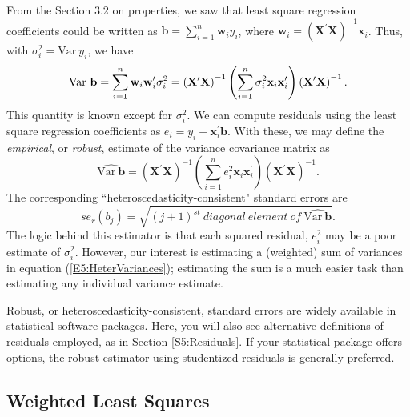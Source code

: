 From the Section 3.2 on properties, we saw that least square
regression coefficients could be written as $ \mathbf{b} =
\sum_{i=1}^n \mathbf{w}_i y_i $, where $\mathbf{w}_i =\left(
\mathbf{X}^{\prime}\mathbf{X}\right)^{-1} \mathbf{x}_i$. Thus, with
$\sigma_i^2 = \mathrm{Var~} y_i$, we have
\begin{equation}\label{E5:HeterVariances}
\mathrm{Var~}\mathbf{b} = \sum_{i=1}^n \mathbf{w}_i
\mathbf{w}_i^{\prime} \sigma_i^2  \\
=\left( \mathbf{X}^{\prime}\mathbf{X}\right)^{-1} \left(
\sum_{i=1}^n \sigma_i^2 \mathbf{x}_i \mathbf{x}_i^{\prime} \right)
\left( \mathbf{X}^{\prime}\mathbf{X}\right)^{-1}.
\end{equation}
This quantity is known except for $\sigma_i^2$. We can compute
residuals using the least square regression coefficients as $e_i =
y_i - \mathbf{x}_i^{\prime} \mathbf{b}$. With these, we may define
the \emph{empirical}, or \emph{robust}, estimate of the variance
covariance matrix as
\begin{equation*}
\widehat{\mathrm{Var~}\mathbf{b}} =\left(
\mathbf{X}^{\prime}\mathbf{X}\right)^{-1} \left( \sum_{i=1}^n e_i^2
\mathbf{x}_i \mathbf{x}_i^{\prime} \right) \left(
\mathbf{X}^{\prime}\mathbf{X}\right)^{-1}.
\end{equation*}
The corresponding ``heteroscedasticity-consistent" standard errors
are
\begin{equation}\label{E5:RobustSEs}
se_r(b_j) = \sqrt{(j+1)^{st} ~diagonal~
element~of~\widehat{\mathrm{Var~}\mathbf{b}}}.
\end{equation}
The logic behind this estimator is that each squared residual,
$e_i^2$ may be a poor estimate of $\sigma_i^2$. However, our
interest is estimating a (weighted) sum of variances in equation
(\ref{E5:HeterVariances}); estimating the sum is a much easier task
than estimating any individual variance estimate.

Robust, or heteroscedasticity-consistent, standard errors are widely
available in statistical software packages. Here, you will also see
alternative definitions of residuals employed, as in Section
\ref{S5:Residuals}. If your statistical package offers options, the
robust estimator using studentized residuals is generally preferred.


\subsection{Weighted Least Squares}\label{S5:WeightedLS}

